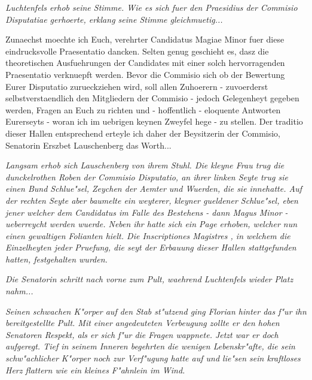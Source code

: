 \documentclass[a5paper,8pt]{book}
\begin{document}
\textit{Luchtenfels erhob seine Stimme. Wie es sich fuer den Praesidius der Commisio Disputatiae gerhoerte, erklang seine Stimme gleichmuetig...}

\grqq Zunaechst moechte ich Euch, verehrter Candidatus Magiae Minor fuer diese eindrucksvolle Praesentatio dancken. Selten genug geschieht es, dasz die theoretischen 
Ausfuehrungen der Candidates mit einer solch hervorragenden Praesentatio verknuepft werden. Bevor die Commisio sich ob der Bewertung Eurer Disputatio zurueckziehen wird, soll 
allen Zuhoerern - zuvoerderst selbstverstaendlich den Mitgliedern der Commisio - jedoch Gelegenheyt gegeben werden, Fragen an Euch zu richten und - hoffentlich - eloquente 
Antworten Eurerseyts - woran ich im uebrigen keynen Zweyfel hege - zu stellen. Der traditio dieser Hallen entsprechend erteyle ich daher der Beysitzerin der Commisio, Senatorin 
Erszbet Lauschenberg das Worth... \grqq

\textit{Langsam erhob sich Lauschenberg von ihrem Stuhl. Die kleyne Frau trug die dunckelrothen Roben der Commisio Disputatio, an ihrer linken Seyte trug sie einen Bund 
Schlue"sel, Zeychen der Aemter und Wuerden, die sie innehatte. Auf der rechten Seyte aber baumelte ein weyterer, kleyner gueldener Schlue"sel, eben jener welcher dem Candidatus 
im Falle des Bestehens - dann Magus Minor - ueberreycht werden wuerde.
Neben ihr hatte sich ein Page erhoben, welcher nun einen gewaltigen Folianten hielt. Die \grqq Inscriptiones Magistres \grqq , in welchem die Einzelheyten jeder Pruefung, die 
seyt der Erbauung dieser Hallen stattgefunden hatten, festgehalten wurden.}

\textit{Die Senatorin schritt nach vorne zum Pult, waehrend Luchtenfels wieder Platz nahm... }

\textit{Seinen schwachen K"orper auf den Stab st"utzend ging Florian hinter das f"ur ihn bereitgestellte Pult. Mit einer angedeuteten Verbeugung zollte er den hohen Senatoren 
Respekt, als er sich f"ur die Fragen wappnete.
Jetzt war er doch aufgeregt. Tief in seinem Inneren begehrten die wenigen Lebenskr"afte, die sein schw"achlicher K"orper noch zur Verf"ugung hatte auf und lie"sen sein 
kraftloses Herz flattern wie ein kleines F"ahnlein im Wind.}
\end{document}
